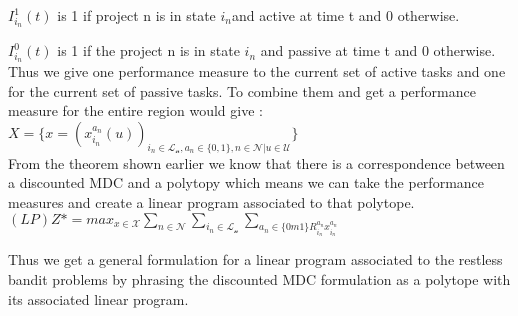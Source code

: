 $I_{i_n}^1(t)$ is 1 if project n is in state $i_n$and active at time t and 0 otherwise.

$I_{i_n}^0(t)$ is 1 if the project n is in state $i_n$ and passive at time t and 0 otherwise.\\

Thus we give one performance measure to the current set of active tasks and one for the current set of passive tasks. To combine them and get a performance measure for the entire region would give : \\


$X = \{x = (x_{i_n}^{a_n}(u))_{i_n \in \mathcal{L_n}, a_n \in\{0,1\}, n \in \mathcal{N}|u \in \mathcal{U}}\}$\\

From the theorem shown earlier we know that there is a correspondence between a discounted MDC and a polytopy which means we can take the performance measures and create a linear program associated to that polytope.\\

$(LP) Z* = max_{x \in \mathcal{X}} \sum_{n \in \mathcal{N}} \sum_{i_n \in \mathcal{L_n}} 
\sum_{a_n \in \{ 0m1\} R_{i_n}^{a_n} x_{i_n}^{a_n}} $

Thus we get a general formulation for a linear program associated to the restless bandit problems by phrasing the discounted MDC formulation as a polytope with its associated linear program. 
